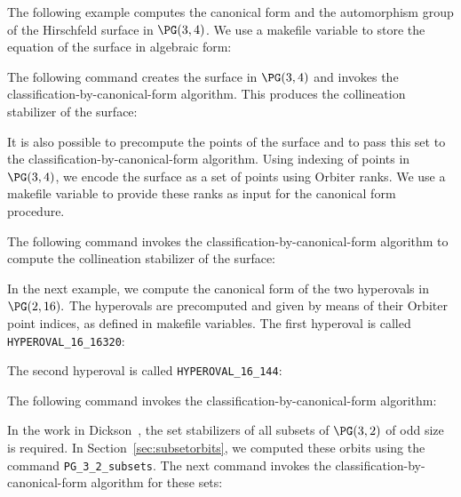 The following example computes the canonical form 
and the automorphism group of the Hirschfeld surface in $\PG(3,4)$. 
We use a makefile variable to store the equation of the surface in algebraic form:


The following command creates the surface in $\PG(3,4)$ and invokes the 
classification-by-canonical-form algorithm. 
This produces the collineation stabilizer of the surface:




It is also possible to precompute the points of the surface  
and to pass this set to the 
classification-by-canonical-form algorithm.
Using indexing of points in $\PG(3,4)$, we encode the 
surface as a set of points using Orbiter ranks.
We use a makefile variable to provide these ranks 
as input for the canonical form procedure.



The following command invokes the 
classification-by-canonical-form algorithm 
to compute the collineation stabilizer of the surface:



\bigskip

In the next example, we compute the canonical 
form of the two hyperovals in $\PG(2,16).$ 
The hyperovals are precomputed and given by means of their Orbiter point indices, 
as defined in makefile variables.
The first hyperoval is called \verb'HYPEROVAL_16_16320':


The second hyperoval is called \verb'HYPEROVAL_16_144':


The following command invokes the 
classification-by-canonical-form algorithm:



\bigskip

In the work in Dickson~\cite{Dickson15}, 
the set stabilizers of all subsets of $\PG(3,2)$ of odd size is required. 
In Section~\ref{sec:subsetorbits}, 
we computed these orbits using the command \verb'PG_3_2_subsets'. 
The next command invokes the 
classification-by-canonical-form algorithm for these sets:

